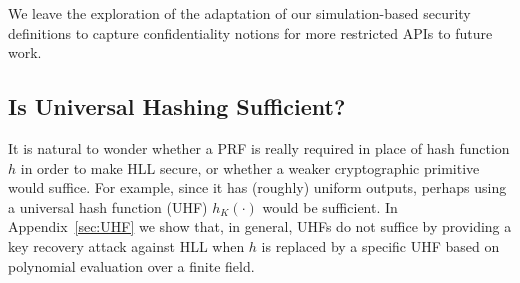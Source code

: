 \documentclass[sigconf, anonymous, dvipsnames]{acmart} %
\begin{document}


We leave the exploration of the adaptation of our simulation-based security definitions to capture confidentiality notions for more restricted APIs to future work. 

\subsection{Is Universal Hashing Sufficient?}

It is natural to wonder whether a PRF is really required in place of hash function $h$ in order to make HLL secure, or whether a weaker cryptographic primitive would suffice. For example, since it has (roughly) uniform outputs, perhaps using a universal hash function (UHF) $h_K(\cdot)$ would be sufficient. In Appendix~\ref{sec:UHF} we show that, in general, UHFs do not suffice by providing a key recovery attack against HLL when $h$ is replaced by a specific UHF based on polynomial evaluation over a finite field. 
\end{document}
